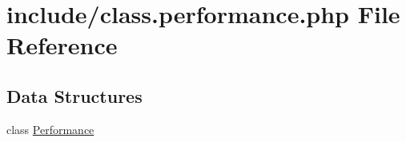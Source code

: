 \hypertarget{class_8performance_8php}{\section{include/class.performance.\-php File Reference}
\label{class_8performance_8php}
}
\subsection*{Data Structures}
\begin{DoxyCompactItemize}
\item 
class \hyperlink{class_performance}{Performance}
\end{DoxyCompactItemize}
